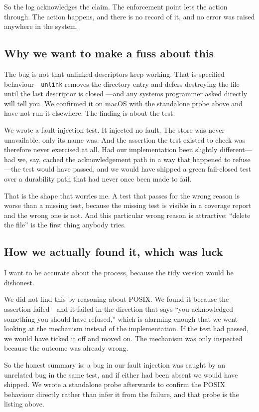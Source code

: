 \documentclass[11pt]{article}
\begin{document}
So the log acknowledges the claim. The enforcement point lets the action
through. The action happens, and there is no record of it, and no error was
raised anywhere in the system.

\subsection{Why we want to make a fuss about this}

The bug is not that unlinked descriptors keep working. That is specified
behaviour---\texttt{unlink} removes the directory entry and defers destroying
the file until the last descriptor is closed \cite{posix2018}---and any systems
programmer asked directly will tell you. We confirmed it on macOS with the
standalone probe above and have not run it elsewhere. The finding is about the
test.

We wrote a fault-injection test. It injected no fault. The store was never
unavailable; only its name was. And the assertion the test existed to check
was therefore never exercised at all. Had our implementation been slightly
different---had we, say, cached the acknowledgement path in a way that
happened to refuse---the test would have passed, and we would have shipped a
green fail-closed test over a durability path that had never once been made to
fail.

That is the shape that worries me. A test that passes for the wrong reason is
worse than a missing test, because the missing test is visible in a coverage
report and the wrong one is not. And this particular wrong reason is
attractive: ``delete the file'' is the first thing anybody tries.

\subsection{How we actually found it, which was luck}

I want to be accurate about the process, because the tidy version would be
dishonest.

We did not find this by reasoning about POSIX. We found it because the
assertion failed---and it failed in the direction that says ``you acknowledged
something you should have refused,'' which is alarming enough that we went
looking at the mechanism instead of the implementation. If the test had passed,
we would have ticked it off and moved on. The mechanism was only inspected
because the outcome was already wrong.

So the honest summary is: a bug in our fault injection was caught by an
unrelated bug in the same test, and if either had been absent we would have
shipped. We wrote a standalone probe afterwards to confirm the POSIX behaviour
directly rather than infer it from the failure, and that probe is the listing
above.
\end{document}
